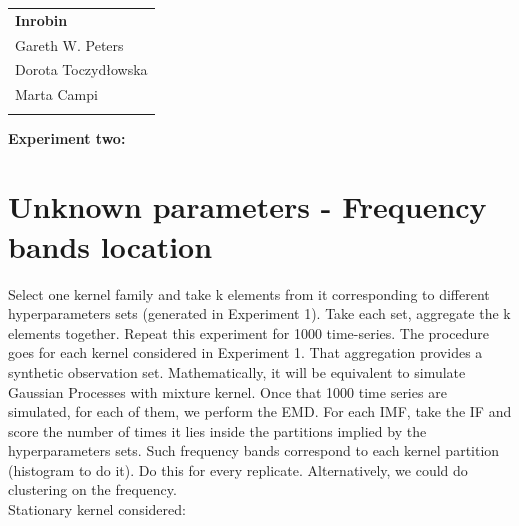 \documentclass[11pt, a4paper]{article} %
\begin{document}
	
	
\setlength{\parindent}{0pt} %
\onehalfspacing				%


\begin{tabular}{p{15.5cm}}
	{\large \textbf{Inrobin}} \\
	Gareth W. Peters  \\ 
	Dorota Toczydłowska\\
	Marta Campi\\
	\hline
	\\
\end{tabular}

\vspace*{0.3cm}				%


\begin{center}
	{\LARGE \textbf{Experiment two:}}
	\vspace{2mm}	
\end{center} 

\section*{Unknown parameters - Frequency bands location}
Select one kernel family and take k elements from it corresponding to different hyperparameters sets (generated in Experiment 1). Take each set, aggregate the k elements together. Repeat this experiment for 1000 time-series. The procedure goes for each kernel considered in Experiment 1. That aggregation provides a synthetic observation set. Mathematically, it will be equivalent to simulate Gaussian Processes with mixture kernel. Once that 1000 time series are simulated, for each of them, we perform the EMD. For each IMF, take the IF and score the number of times it lies inside the partitions implied by the hyperparameters sets. Such frequency bands correspond to each kernel partition (histogram to do it). Do this for every replicate. Alternatively, we could do clustering on the frequency.\\ 

Stationary kernel considered:
\end{document}
